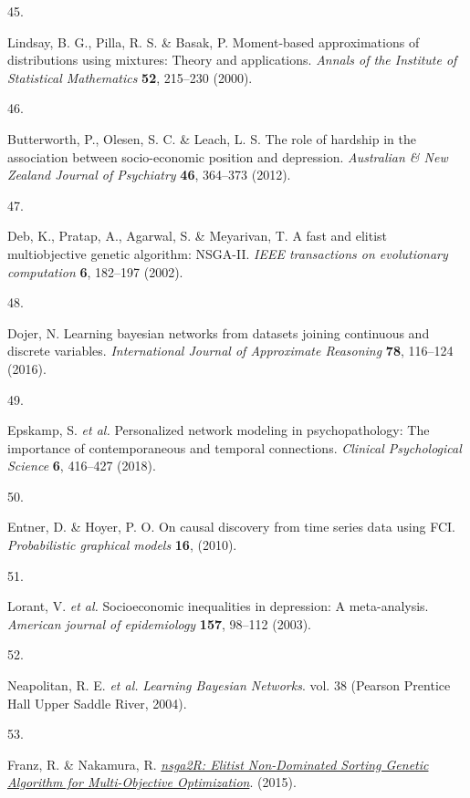 \documentclass[
]{article}
\newlength{\cslhangindent}
\newlength{\csllabelwidth}
\newenvironment{CSLReferences}[2] %
 {\begin{list}{}{%
  \setlength{\itemindent}{0pt}
  \setlength{\leftmargin}{0pt}
  \setlength{\parsep}{0pt}
  \ifodd #1
   \setlength{\leftmargin}{\cslhangindent}
   \setlength{\itemindent}{-1\cslhangindent}
  \fi
  \setlength{\itemsep}{#2\baselineskip}}}
 {\end{list}}
\newcommand{\CSLLeftMargin}[1]{\parbox[t]{\csllabelwidth}{\strut#1\strut}}
\newcommand{\CSLRightInline}[1]{\parbox[t]{\linewidth - \csllabelwidth}{\strut#1\strut}}
\begin{document}
\begin{CSLReferences}{0}{0}
\CSLLeftMargin{45. }%
\CSLRightInline{Lindsay, B. G., Pilla, R. S. \& Basak, P. Moment-based
approximations of distributions using mixtures: Theory and applications.
\emph{Annals of the Institute of Statistical Mathematics} \textbf{52},
215--230 (2000).}

\CSLLeftMargin{46. }%
\CSLRightInline{Butterworth, P., Olesen, S. C. \& Leach, L. S. The role
of hardship in the association between socio-economic position and
depression. \emph{Australian \& New Zealand Journal of Psychiatry}
\textbf{46}, 364--373 (2012).}

\CSLLeftMargin{47. }%
\CSLRightInline{Deb, K., Pratap, A., Agarwal, S. \& Meyarivan, T. A fast
and elitist multiobjective genetic algorithm: NSGA-II. \emph{IEEE
transactions on evolutionary computation} \textbf{6}, 182--197 (2002).}

\CSLLeftMargin{48. }%
\CSLRightInline{Dojer, N. Learning bayesian networks from datasets
joining continuous and discrete variables. \emph{International Journal
of Approximate Reasoning} \textbf{78}, 116--124 (2016).}

\CSLLeftMargin{49. }%
\CSLRightInline{Epskamp, S. \emph{et al.} Personalized network modeling
in psychopathology: The importance of contemporaneous and temporal
connections. \emph{Clinical Psychological Science} \textbf{6}, 416--427
(2018).}

\CSLLeftMargin{50. }%
\CSLRightInline{Entner, D. \& Hoyer, P. O. On causal discovery from time
series data using FCI. \emph{Probabilistic graphical models}
\textbf{16}, (2010).}

\CSLLeftMargin{51. }%
\CSLRightInline{Lorant, V. \emph{et al.} Socioeconomic inequalities in
depression: A meta-analysis. \emph{American journal of epidemiology}
\textbf{157}, 98--112 (2003).}

\CSLLeftMargin{52. }%
\CSLRightInline{Neapolitan, R. E. \emph{et al.} \emph{Learning Bayesian
Networks}. vol. 38 (Pearson Prentice Hall Upper Saddle River, 2004).}

\CSLLeftMargin{53. }%
\CSLRightInline{Franz, R. \& Nakamura, R.
\emph{\href{https://CRAN.R-project.org/package=nsga2R}{nsga2R: Elitist
Non-Dominated Sorting Genetic Algorithm for Multi-Objective
Optimization}}. (2015).}


\end{CSLReferences}
\end{document}
